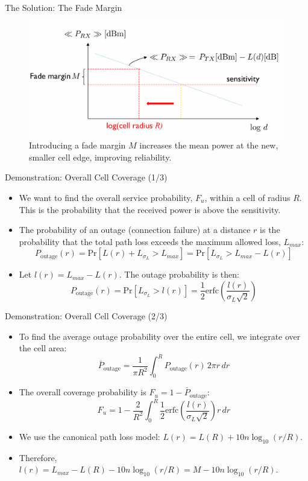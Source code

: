 \documentclass{beamer}
\begin{document}
	\begin{frame}{The Solution: The Fade Margin}
		\begin{figure}
			\centering
			\includegraphics[width=0.9\linewidth]{"pictures/fade-margin-concept-2.png"}
			\caption{Introducing a fade margin $M$ increases the mean power at the new, smaller cell edge, improving reliability.}
		\end{figure}
	\end{frame}
	
	\begin{frame}{Demonstration: Overall Cell Coverage (1/3)}
		\begin{itemize}
			\item We want to find the overall service probability, $F_u$, within a cell of radius $R$. This is the probability that the received power is above the sensitivity.
			\item The probability of an outage (connection failure) at a distance $r$ is the probability that the total path loss exceeds the maximum allowed loss, $L_{max}$:
			\[ P_{\text{outage}}(r) = \text{Pr}[L(r) + L_{\sigma_L} > L_{max}] = \text{Pr}[L_{\sigma_L} > L_{max} - L(r)] \]
			\item Let $l(r) = L_{max} - L(r)$. The outage probability is then:
			\[ P_{\text{outage}}(r) = \text{Pr}[L_{\sigma_L} > l(r)] = \frac{1}{2}\text{erfc}\left(\frac{l(r)}{\sigma_L\sqrt{2}}\right) \]
		\end{itemize}
	\end{frame}
	
	\begin{frame}{Demonstration: Overall Cell Coverage (2/3)}
		\begin{itemize}
			\item To find the average outage probability over the entire cell, we integrate over the cell area:
			\[ \bar{P}_{\text{outage}} = \frac{1}{\pi R^2} \int_0^R P_{\text{outage}}(r) \, 2\pi r \, dr \]
			\item The overall coverage probability is $F_u = 1 - \bar{P}_{\text{outage}}$:
			\[ F_u = 1 - \frac{2}{R^2} \int_0^R \frac{1}{2}\text{erfc}\left(\frac{l(r)}{\sigma_L\sqrt{2}}\right) r \, dr \]
			\item We use the canonical path loss model: $L(r) = L(R) + 10n \log_{10}(r/R)$.
			\item Therefore, $l(r) = L_{max} - L(R) - 10n \log_{10}(r/R) = M - 10n \log_{10}(r/R)$.
		\end{itemize}
	\end{frame}
	
\end{document}
